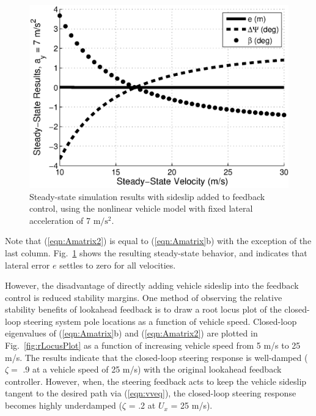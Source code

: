 \documentclass{nVSD2e}
\theoremstyle{plain}
\theoremstyle{definition}
\theoremstyle{remark}
\begin{document}
\begin{figure}[h]
\centering
\includegraphics[width=.55\columnwidth]{figures/LinearErrorPlotBeta.eps}
\caption{Steady-state simulation results with sideslip added to feedback control, using the nonlinear vehicle model with fixed lateral acceleration of 7 $\mathrm{m/s^2}$.}
\label{fig:linError2}
\end{figure} 
 
Note that (\ref{eqn:Amatrix2}) is equal to (\ref{eqn:Amatrix}b) with the exception of the last column. Fig.~\ref{fig:linError2}
shows the resulting steady-state behavior, and indicates that lateral error $e$ settles to
zero for all velocities. 

However, the disadvantage of directly adding vehicle sideslip 
into the feedback control is reduced stability margins. One method of observing the relative stability benefits of lookahead feedback is to draw a 
root locus plot of the closed-loop steering system pole locations as a function of vehicle speed. Closed-loop eigenvalues of (\ref{eqn:Amatrix}b) and (\ref{eqn:Amatrix2})
are plotted in Fig.~\ref{fig:rLocusPlot} as a function of increasing vehicle speed from 5 m/s to 25 m/s. The results indicate that the closed-loop steering response
is well-damped ($\zeta =$ .9 at a vehicle speed of 25 m/s) with the original lookahead feedback controller. However, when, the steering feedback acts to 
keep the vehicle sideslip tangent to the desired path via (\ref{eqn:vveq}), the closed-loop steering response becomes highly underdamped 
($\zeta$ = .2 at $U_x$ = 25 m/s).  
\end{document}
